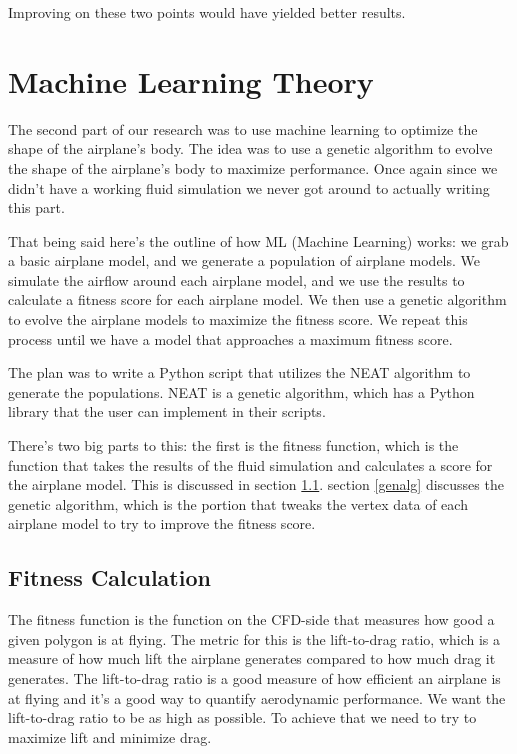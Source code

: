\documentclass[a4paper,12pt,titlepage]{article}
\begin{document}
Improving on these two points would have yielded better results.

\pagebreak
\section{Machine Learning Theory}
The second part of our research was to use machine learning to optimize the shape
of the airplane's body. The idea was to use a genetic algorithm to evolve the
shape of the airplane's body to maximize performance. Once again since we didn't
have a working fluid simulation we never got around to actually writing this part.

That being said here's the outline of how ML (Machine Learning) works: we grab
a basic airplane model, and we generate a population of airplane models. We
simulate the airflow around each airplane model, and we use the results to calculate
a fitness score for each airplane model. We then use a genetic algorithm to evolve
the airplane models to maximize the fitness score. We repeat this process until
we have a model that approaches a maximum fitness score.

The plan was to write a Python script that utilizes the NEAT algorithm to generate
the populations. NEAT is a genetic algorithm, which has a Python library that
the user can implement in their scripts.

There's two big parts to this: the first is the fitness function, which is the
function that takes the results of the fluid simulation and calculates a score
for the airplane model. This is discussed in section \ref{fitness}.
section \ref{genalg} discusses the genetic algorithm, which is the portion that tweaks
the vertex data of each airplane model to try to improve the fitness score.

\subsection{Fitness Calculation} \label{fitness}
The fitness function is the function on the CFD-side that measures how good a
given polygon is at flying. The metric for this is the lift-to-drag ratio, which
is a measure of how much lift the airplane generates compared to how much drag
it generates. The lift-to-drag ratio is a good measure of how efficient an airplane
is at flying and it's a good way to quantify aerodynamic performance. We want the
lift-to-drag ratio to be as high as possible. To achieve that we need to try
to maximize lift and minimize drag.
\end{document}
